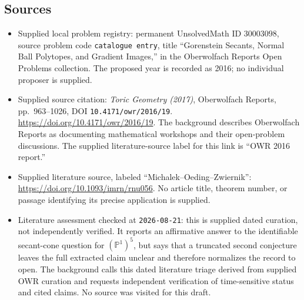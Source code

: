 \documentclass[11pt]{article}
\newcommand{\PP}{\mathbb{P}}
\begin{document}
\subsection{Sources}
\begin{itemize}
\item Supplied local problem registry: permanent UnsolvedMath ID \(30003098\), source problem code \texttt{catalogue entry}, title ``Gorenstein Secants, Normal Ball Polytopes, and Gradient Images,'' in the Oberwolfach Reports Open Problems collection. The proposed year is recorded as 2016; no individual proposer is supplied.
\item Supplied source citation: \emph{Toric Geometry (2017)}, Oberwolfach Reports, pp.\ 963--1026, DOI \texttt{10.4171/owr/2016/19}. \url{https://doi.org/10.4171/owr/2016/19}. The background describes Oberwolfach Reports as documenting mathematical workshops and their open-problem discussions. The supplied literature-source label for this link is ``OWR 2016 report.''
\item Supplied literature source, labeled ``Michalek--Oeding--Zwiernik'': \url{https://doi.org/10.1093/imrn/rnu056}. No article title, theorem number, or passage identifying its precise application is supplied.
\item Literature assessment checked at \texttt{2026-08-21}: this is supplied dated curation, not independently verified. It reports an affirmative answer to the identifiable secant-cone question for \((\PP^1)^5\), but says that a truncated second conjecture leaves the full extracted claim unclear and therefore normalizes the record to open. The background calls this dated literature triage derived from supplied OWR curation and requests independent verification of time-sensitive status and cited claims. No source was visited for this draft.
\end{itemize}
\end{document}
